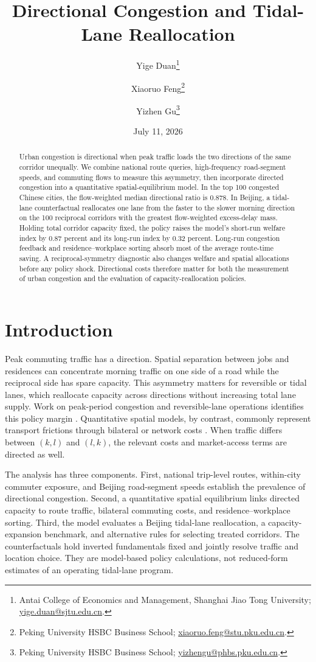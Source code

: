 \documentclass[12pt]{article}
\title{Directional Congestion and Tidal-Lane Reallocation}
\author{
Yige Duan\thanks{Antai College of Economics and Management, Shanghai Jiao Tong University; \href{mailto:yige.duan@sjtu.edu.cn}{yige.duan@sjtu.edu.cn}.}
\and
Xiaoruo Feng\thanks{Peking University HSBC Business School; \href{mailto:xiaoruo.feng@stu.pku.edu.cn}{xiaoruo.feng@stu.pku.edu.cn}.}
\and
Yizhen Gu\thanks{Peking University HSBC Business School; \href{mailto:yizhengu@phbs.pku.edu.cn}{yizhengu@phbs.pku.edu.cn}.}
}
\date{July 11, 2026}
\begin{document}
\maketitle

\begin{abstract}
Urban congestion is directional when peak traffic loads the two directions of the same corridor unequally. We combine national route queries, high-frequency road-segment speeds, and commuting flows to measure this asymmetry, then incorporate directed congestion into a quantitative spatial-equilibrium model. In the top 100 congested Chinese cities, the flow-weighted median directional ratio is 0.878. In Beijing, a tidal-lane counterfactual reallocates one lane from the faster to the slower morning direction on the 100 reciprocal corridors with the greatest flow-weighted excess-delay mass. Holding total corridor capacity fixed, the policy raises the model's short-run welfare index by 0.87 percent and its long-run index by 0.32 percent. Long-run congestion feedback and residence--workplace sorting absorb most of the average route-time saving. A reciprocal-symmetry diagnostic also changes welfare and spatial allocations before any policy shock. Directional costs therefore matter for both the measurement of urban congestion and the evaluation of capacity-reallocation policies.
\end{abstract}

\section{Introduction}

Peak commuting traffic has a direction. Spatial separation between jobs and residences can concentrate morning traffic on one side of a road while the reciprocal side has spare capacity. This asymmetry matters for reversible or tidal lanes, which reallocate capacity across directions without increasing total lane supply. Work on peak-period congestion and reversible-lane operations identifies this policy margin \citep{vickrey1969,arnott1993,wolshon2006}. Quantitative spatial models, by contrast, commonly represent transport frictions through bilateral or network costs \citep{ahlfeldt2015,allenarkolakis2022}. When traffic differs between $(k,l)$ and $(l,k)$, the relevant costs and market-access terms are directed as well.

The analysis has three components. First, national trip-level routes, within-city commuter exposure, and Beijing road-segment speeds establish the prevalence of directional congestion. Second, a quantitative spatial equilibrium links directed capacity to route traffic, bilateral commuting costs, and residence--workplace sorting. Third, the model evaluates a Beijing tidal-lane reallocation, a capacity-expansion benchmark, and alternative rules for selecting treated corridors. The counterfactuals hold inverted fundamentals fixed and jointly resolve traffic and location choice. They are model-based policy calculations, not reduced-form estimates of an operating tidal-lane program.
\end{document}
